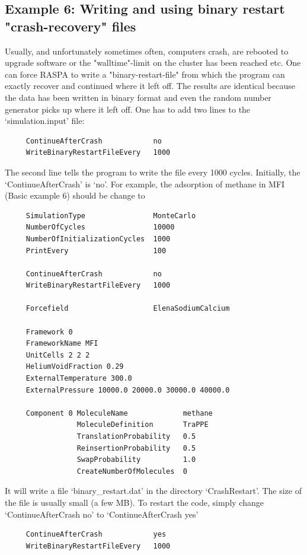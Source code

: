\subsection*{Example 6: Writing and using binary restart "crash-recovery" files}

Usually, and unfortunately sometimes often, computers crash, are rebooted to upgrade software or the "walltime"-limit on the cluster has been reached etc.
One can force RASPA to write a "binary-restart-file" from which the program can exactly recover and continued
where it left off. The results are identical because the data has been written in binary format and even the
random number generator picks up where it left off.
One has to add two lines to the `simulation.input' file:
\begin{tiny}
\begin{verbatim}
     ContinueAfterCrash            no
     WriteBinaryRestartFileEvery   1000
\end{verbatim}
\end{tiny}
The second line tells the program to write the file every 1000 cycles. Initially, the `ContinueAfterCrash' is `no'.
For example, the adsorption of methane in MFI (Basic example 6) should be change to

\begin{tiny}
\begin{verbatim}
     SimulationType                MonteCarlo
     NumberOfCycles                10000
     NumberOfInitializationCycles  1000
     PrintEvery                    100

     ContinueAfterCrash            no
     WriteBinaryRestartFileEvery   1000

     Forcefield                    ElenaSodiumCalcium

     Framework 0
     FrameworkName MFI
     UnitCells 2 2 2
     HeliumVoidFraction 0.29
     ExternalTemperature 300.0
     ExternalPressure 10000.0 20000.0 30000.0 40000.0

     Component 0 MoleculeName             methane
                 MoleculeDefinition       TraPPE
                 TranslationProbability   0.5
                 ReinsertionProbability   0.5
                 SwapProbability          1.0
                 CreateNumberOfMolecules  0
\end{verbatim}
\end{tiny}
It will write a file `binary\_restart.dat' in the directory `CrashRestart'. The size of the file is usually small (a few MB).
To restart the code, simply change `ContinueAfterCrash no' to `ContinueAfterCrash yes'
\begin{tiny}
\begin{verbatim}
     ContinueAfterCrash            yes
     WriteBinaryRestartFileEvery   1000
\end{verbatim}
\end{tiny}

